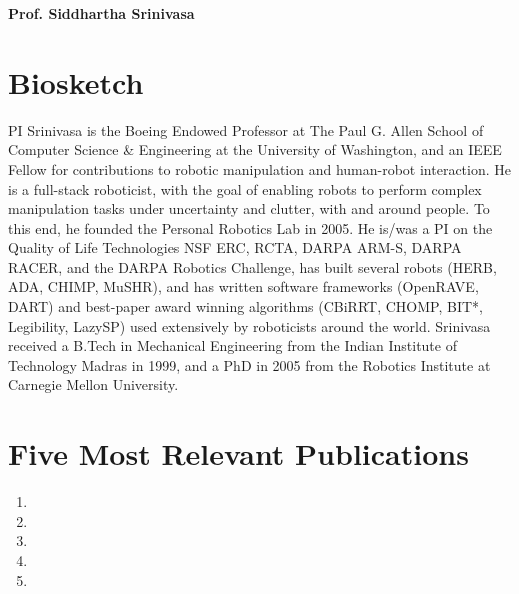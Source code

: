 \documentclass[10pt]{article}
\newcommand{\svn}[1]{\svnsub#1}
\def\svnsub$#1${#1}
\begin{document}
\pagestyle{empty} %

\par{\centering
		{\bf\LARGE Prof. Siddhartha Srinivasa
	}\bigskip\par}





\section{Biosketch}
\noindent PI Srinivasa is the Boeing Endowed Professor at The Paul G. Allen School of Computer Science \& Engineering at the University of Washington, and an IEEE Fellow for contributions to robotic manipulation and human-robot interaction. He is a full-stack roboticist, with the goal of enabling robots to perform complex manipulation tasks under uncertainty and clutter, with and around people. To this end, he founded the Personal Robotics Lab in 2005. He is/was a PI on the Quality of Life Technologies NSF ERC, RCTA, DARPA ARM-S, DARPA RACER, and the DARPA Robotics Challenge, has built several robots (HERB, ADA, CHIMP, MuSHR), and has written software frameworks (OpenRAVE, DART) and best-paper award winning algorithms (CBiRRT, CHOMP, BIT*, Legibility, LazySP) used extensively by roboticists around the world. Srinivasa received a B.Tech in Mechanical Engineering from the Indian Institute of Technology Madras in 1999, and a PhD in 2005 from the Robotics Institute at Carnegie Mellon University.





\section{Five Most Relevant Publications}
\renewcommand{\labelenumi}{[ \Alph{enumi} ]\hfill}
\begin{enumerate}
\item {}
\item {}
\item {}
\item {}
\item {}


\end{enumerate}
\end{document}
